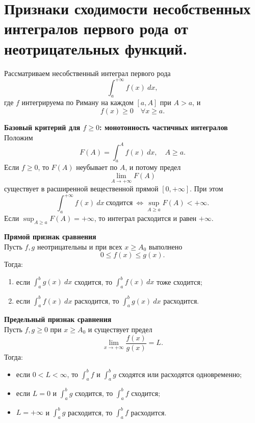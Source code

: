 \documentclass[14pt]{extreport}
\begin{document}
    \chapter{Признаки сходимости несобственных интегралов первого рода от неотрицательных функций.}

    Рассматриваем несобственный интеграл первого рода
    \[
    \int_a^{+\infty} f(x)\ dx,
    \]
    где $f$ интегрируема по Риману на каждом $[a,A]$ при $A>a$, и
    \[
    f(x) \geq 0 \quad \forall x \geq a.
    \]

    \begin{theorem}
        \textbf{Базовый критерий для $f \geq 0$: монотонность частичных интегралов}\\
        Положим
        \[
        F(A) = \int_a^A f(x)\ dx, \quad A \geq a.
        \]
        Если $f \geq 0$, то $F(A)$ неубывает по $A$, и потому предел
        \[
        \lim_{A \rightarrow +\infty} F(A)
        \]
        существует в расширенной вещественной прямой $[0,+\infty]$. При этом 
        \[
        \int_a^{+\infty} f(x)\ dx\ \text{сходится}\ \Leftrightarrow \sup_{A \geq a} F(A) < +\infty.
        \]
        Если $\sup_{A \geq a} F(A) = +\infty$, то интеграл расходится и равен $+\infty$.
    \end{theorem}

    \begin{theorem}
        \textbf{Прямой признак сравнения}\\
        Пусть $f,g$ неотрицательны и при всех $x \geq A_0$ выполнено
        \[
        0 \leq f(x) \leq g(x).
        \]
        Тогда:
        \begin{enumerate}
            \item если $\int_a^b g(x)\ dx$ сходится, то $\int_a^b f(x)\ dx$ тоже сходится;
            \item если $\int_a^b f(x)\ dx$ расходится, то $\int_a^b g(x)\ dx$ расходится.
        \end{enumerate}
    \end{theorem}

    \begin{theorem}
        \textbf{Предельный признак сравнения}\\
        Пусть $f,g \geq 0$ при $x \geq A_0$ и существует предел
        \[
        \lim_{x \rightarrow +\infty} \frac{f(x)}{g(x)} = L.
        \]
        Тогда:
        \begin{itemize}
            \item если $0 < L < \infty$, то $\int_a^b f$ и $\int_a^b g$ сходятся или расходятся одновременно;
            \item если $L = 0$ и $\int_a^b g$ сходится, то $\int_a^b f$ сходится;
            \item $L = +\infty$ и $\int_a^b g$ расходится, то $\int_a^b f$ расходится.
        \end{itemize}
    \end{theorem}
\end{document}
